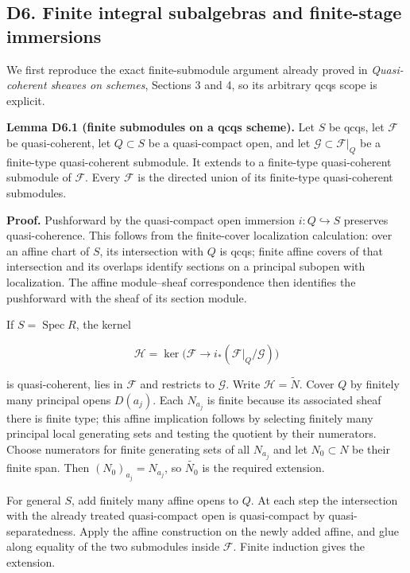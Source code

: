\documentclass[11pt,a4paper,openany]{report}
\begin{document}
\subsection{D6. Finite integral subalgebras and finite-stage immersions}\label{AG-RG-S04-d6.-finite-integral-subalgebras-and-finite-stage-immersions}

We first reproduce the exact finite-submodule argument already proved in \emph{Quasi-coherent sheaves on schemes}, Sections 3 and 4, so its arbitrary qcqs scope is explicit.

\textbf{Lemma D6.1 (finite submodules on a qcqs scheme).} Let \(S\) be qcqs, let \(\mathcal F\) be quasi-coherent, let \(Q\subset S\) be a quasi-compact open, and let \(\mathcal G\subset\mathcal F|_Q\) be a finite-type quasi-coherent submodule. It extends to a finite-type quasi-coherent submodule of \(\mathcal F\). Every \(\mathcal F\) is the directed union of its finite-type quasi-coherent submodules.

\textbf{Proof.} Pushforward by the quasi-compact open immersion \(i:Q\hookrightarrow S\) preserves quasi-coherence. This follows from the finite-cover localization calculation: over an affine chart of \(S\), its intersection with \(Q\) is qcqs; finite affine covers of that intersection and its overlaps identify sections on a principal subopen with localization. The affine module--sheaf correspondence then identifies the pushforward with the sheaf of its section module.

If \(S=\operatorname{Spec}R\), the kernel

\[
\mathcal H=\ker\bigl(\mathcal F\longrightarrow
i_*(\mathcal F|_Q/\mathcal G)\bigr)
\]

is quasi-coherent, lies in \(\mathcal F\) and restricts to \(\mathcal G\). Write \(\mathcal H=\widetilde N\). Cover \(Q\) by finitely many principal opens \(D(a_j)\). Each \(N_{a_j}\) is finite because its associated sheaf there is finite type; this affine implication follows by selecting finitely many principal local generating sets and testing the quotient by their numerators. Choose numerators for finite generating sets of all \(N_{a_j}\) and let \(N_0\subset N\) be their finite span. Then \((N_0)_{a_j}=N_{a_j}\), so \(\widetilde{N_0}\) is the required extension.

For general \(S\), add finitely many affine opens to \(Q\). At each step the intersection with the already treated quasi-compact open is quasi-compact by quasi-separatedness. Apply the affine construction on the newly added affine, and glue along equality of the two submodules inside \(\mathcal F\). Finite induction gives the extension.
\end{document}
